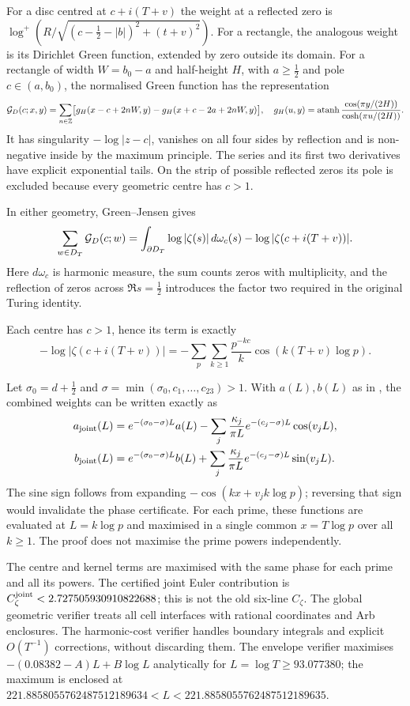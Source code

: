 \documentclass[11pt,reqno]{amsart}
\makeatletter
\let\CG@origeqref\eqref
\newcommand{\CG@gettip}[1]{\@ifundefined{CGTip@#1}{Reference: #1}{\csname CGTip@#1\endcsname}}
\DeclareRobustCommand{\CGeqref}[1]{\pdftooltip{\CG@origeqref{#1}}{\CG@gettip{#1}}}
\numberwithin{equation}{section}
\theoremstyle{definition}
\theoremstyle{remark}
\makeatother
\begin{document}
For a disc centred at $c+i(T+v)$ the weight at a
reflected zero is
$\log^+(R/\sqrt{(c-\frac12-|b|)^2+(t+v)^2})$.
For a rectangle, the analogous weight is its Dirichlet
Green function, extended by zero outside its domain.
For a rectangle of width $W=b_0-a$ and half-height $H$,
with $a\ge\frac12$ and pole $c\in(a,b_0)$,
the normalised Green function has the representation
\[
{\cal G}_D(c;x,y)=\sum_{n\in\mathbb Z}
\bigl[g_H(x-c+2nW,y)-g_H(x+c-2a+2nW,y)\bigr],
\quad
g_H(u,y)=\operatorname{atanh}
\frac{\cos(\pi y/(2H))}{\cosh(\pi u/(2H))}.
\]
It has singularity $-\log|z-c|$, vanishes on all four sides
by reflection and is non-negative inside by the maximum principle.
The series and its first two derivatives have explicit exponential
tails. On the strip of possible reflected zeros its pole is excluded
because every geometric centre has $c>1$.

In either geometry, Green--Jensen gives
\[
\sum_{w\in D_T}{\cal G}_D(c;w)
=\int_{\partial D_T}\log|\zeta(s)|\,d\omega_c(s)
-\log|\zeta(c+i(T+v))|.
\]
Here $d\omega_c$ is harmonic measure, the sum counts
zeros with multiplicity, and the reflection of zeros
across $\Re s=\frac12$ introduces the factor two
required in the original Turing identity.

Each centre has $c>1$, hence its term is exactly
\[
-\log|\zeta(c+i(T+v))|=
-\sum_p\sum_{k\ge1}\frac{p^{-kc}}{k}
\cos(k(T+v)\log p).
\]

Let $\sigma_0=d+\frac12$ and
$\sigma=\min(\sigma_0,c_1,\ldots,c_{23})>1$.
With $a(L),b(L)$ as in \CGeqref{eq:ab_def},
the combined weights can be written exactly as
\[
\begin{aligned}
a_{\rm joint}(L)
&=e^{-(\sigma_0-\sigma)L}a(L)
-\sum_j\frac{\kappa_j}{\pi L}
 e^{-(c_j-\sigma)L}\cos(v_jL),\\
b_{\rm joint}(L)
&=e^{-(\sigma_0-\sigma)L}b(L)
+\sum_j\frac{\kappa_j}{\pi L}
 e^{-(c_j-\sigma)L}\sin(v_jL).
\end{aligned}
\]
The sine sign follows from expanding
$-\cos(kx+v_jk\log p)$; reversing that sign
would invalidate the phase certificate.
For each prime, these functions are evaluated at
$L=k\log p$ and maximised in a single common
$x=T\log p$ over all $k\ge1$.
The proof does not maximise the prime powers independently.

The centre and kernel terms are maximised with
the same phase for each prime and all its powers.
The certified joint Euler contribution is
$C_\zeta^{\rm joint}<2.727505930910822688$;
this is not the old six-line $C_\zeta$.
The global geometric verifier treats all cell
interfaces with rational coordinates and Arb enclosures.
The harmonic-cost verifier handles boundary integrals
and explicit $O(T^{-1})$ corrections, without
discarding them. The envelope verifier maximises
$-(0.08382-A)L+B\log L$ analytically for
$L=\log T\ge93.077380$; the maximum is enclosed at
$221.8858055762487512189634<L<
221.8858055762487512189635$.
\end{document}
